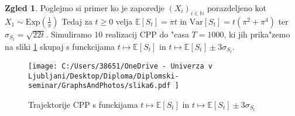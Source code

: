 \documentclass[12pt, a4paper, reqno]{amsart}
\theoremstyle{definition}
\newtheorem{zgled}[definicija]{Zgled}
\theoremstyle{plain}
\newcommand{\R}{\mathbb{R}}
\newcommand{\N}{\mathbb{N}}
\newcommand{\E}{\mathbb{E}}
\newcommand{\Prob}{\mathbb{P}}
\newcommand{\1}{\mathds{1}}
\newcommand{\Var}[1]{\text{Var}\left[#1\right]}
\begin{document}
    \begin{zgled}
        Poglejmo si primer ko je zaporedje $(X_i)_{i\in\N}$ porazdeljeno kot $X_1\sim \text{Exp}(\frac{1}{\pi})$ 
        Tedaj za $t\geq 0 $ velja $\E\left[S_t\right] = \pi t$ in 
        $\Var{S_t} = t(\pi^2 + \pi^4)$ ter $\sigma_{S_t} = \sqrt{22t}$. Simuliramo 10 realizacij CPP do "casa $T=1000$, 
        ki jih prika"zemo na sliki \ref{fig:slika6} skupaj s funckcijama $t \mapsto \E\left[S_t\right]$ in $t \mapsto \E\left[S_t\right] \pm 3\sigma_{S_t}$. 
        \begin{figure}[H]
            \centering
            \texttt{[image: 
                C:/Users/38651/OneDrive - Univerza v Ljubljani/Desktop/Diploma/Diplomski-seminar/GraphsAndPhotos/slika6.pdf
                ]}
            \caption{Trajektorije CPP s funckijama $t \mapsto \E\left[S_t\right]$ in $t \mapsto \E\left[S_t\right] \pm 3\sigma_{S_t}$}
            \label{fig:slika6}
        \end{figure}

    \end{zgled}
    
%
%
%
%
%
%
%
%
\end{document}
